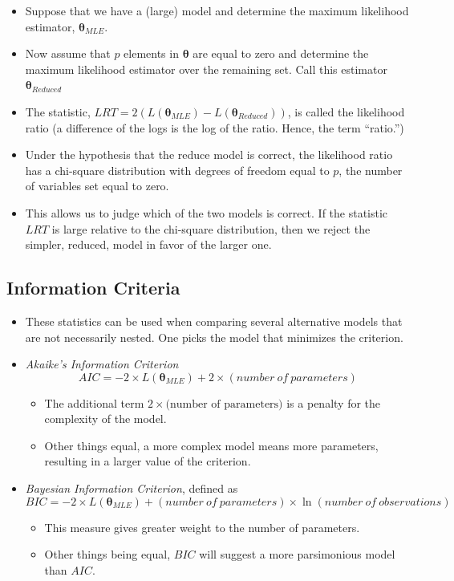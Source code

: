 \documentclass[]{book}
\begin{document}
\begin{itemize}
\item
  Suppose that we have a (large) model and determine the maximum
  likelihood estimator, \(\boldsymbol \theta_{MLE}\).
\item
  Now assume that \(p\) elements in \(\boldsymbol \theta\) are equal to
  zero and determine the maximum likelihood estimator over the remaining
  set. Call this estimator \(\boldsymbol \theta_{Reduced}\)
\item
  The statistic,
  \(LRT= 2 \left( L(\boldsymbol \theta_{MLE}) - L(\boldsymbol \theta_{Reduced}) \right)\),
  is called the likelihood ratio (a difference of the logs is the log of
  the ratio. Hence, the term ``ratio.'')
\item
  Under the hypothesis that the reduce model is correct, the likelihood
  ratio has a chi-square distribution with degrees of freedom equal to
  \(p\), the number of variables set equal to zero.
\item
  This allows us to judge which of the two models is correct. If the
  statistic \(LRT\) is large relative to the chi-square distribution,
  then we reject the simpler, reduced, model in favor of the larger one.
\end{itemize}

\subsection{Information Criteria}\label{information-criteria}

\begin{itemize}
\item
  These statistics can be used when comparing several alternative models
  that are not necessarily nested. One picks the model that minimizes
  the criterion.
\item
  \emph{Akaike's Information Criterion}
  \[AIC = -2 \times L(\boldsymbol \theta_{MLE}) + 2 \times (number~of~parameters)\]

  \begin{itemize}
  \item
    The additional term \(2 \times \text{(number of parameters)}\) is a
    penalty for the complexity of the model.
  \item
    Other things equal, a more complex model means more parameters,
    resulting in a larger value of the criterion.
  \end{itemize}
\item
  \emph{Bayesian Information Criterion}, defined as
  \[BIC = -2 \times L(\boldsymbol \theta_{MLE}) + (number~of~parameters) \times \ln (number~of~observations)\]

  \begin{itemize}
  \item
    This measure gives greater weight to the number of parameters.
  \item
    Other things being equal, \(BIC\) will suggest a more parsimonious
    model than \(AIC\).
  \end{itemize}
\end{itemize}
\end{document}
